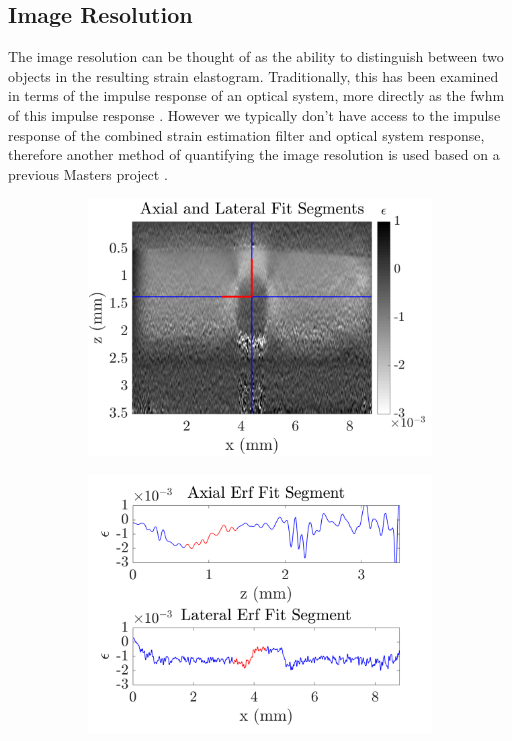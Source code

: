 \subsection{Image Resolution}
The image resolution can be thought of as the ability to distinguish between two objects in the resulting strain elastogram. Traditionally, this has been examined in terms of the impulse response of an optical system, more directly as the \ac{fwhm} of this impulse response \cite{reynolds_resolution_1989}. However we typically don't have access to the impulse response of the combined strain estimation filter and optical system response, therefore another method of quantifying the image resolution is used based on a previous Masters project \cite{hepburn_improving_2017}.

\begin{figure}[t]
	\centering
	\begin{subfigure}{0.49\textwidth}
		\centering
		\includegraphics[width=\textwidth]{strainreview_figs/imageres_regions.png}
	\end{subfigure}
	\begin{subfigure}{0.49\textwidth}
		\centering
		\includegraphics[width=\textwidth]{strainreview_figs/lateral_axial_segments.png}

\end{subfigure}
\end{figure}
